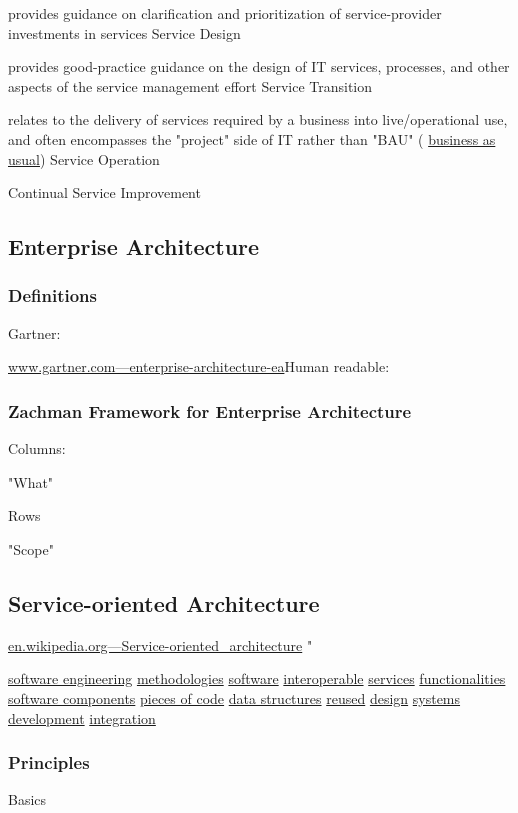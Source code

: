 \documentclass{article}
\begin{document}
provides guidance on clarification and prioritization of service-provider investments in services
Service Design

provides good-practice guidance on the design of IT services, processes, and other aspects of the service management effort
Service Transition

relates to the delivery of services required by a business into live/operational use, and often encompasses the "project" side of IT rather than "BAU" (
\href{http://en.wiktionary.org/wiki/business\_as\_usual}{business as usual})
Service Operation

Continual Service Improvement

\subsection{Enterprise Architecture}
\subsubsection{Definitions}
Gartner:  


\href{http://www.gartner.com/it-glossary/enterprise-architecture-ea/}{www.gartner.com—enterprise-architecture-ea}Human readable: 

\subsubsection{Zachman Framework for Enterprise Architecture}
Columns:

"What"

Rows

"Scope"

\subsection{Service-oriented Architecture}

\href{http://en.wikipedia.org/wiki/Service-oriented\_architecture}{en.wikipedia.org—Service-oriented\_architecture}
 "


\href{http://en.wikipedia.org/wiki/Software\_engineering}{software engineering}
\href{http://en.wikipedia.org/wiki/Methodologies}{methodologies}
\href{http://en.wikipedia.org/wiki/Software}{software}
\href{http://en.wikipedia.org/wiki/Interoperability}{interoperable}
\href{http://en.wikipedia.org/wiki/Service\_\%28systems\_architecture\%29}{services}
\href{http://en.wikipedia.org/wiki/Function\_\%28computer\_science\%29}{functionalities}
\href{http://en.wikipedia.org/wiki/Software\_component}{software components}
\href{http://en.wikipedia.org/wiki/Modular\_programming}{pieces of code}
\href{http://en.wikipedia.org/wiki/Data\_structure}{data structures}
\href{http://en.wikipedia.org/wiki/Code\_reuse}{reused}
\href{http://en.wikipedia.org/wiki/Systems\_design}{design}
\href{http://en.wikipedia.org/wiki/Systems\_development}{systems development}
\href{http://en.wikipedia.org/wiki/Systems\_integration}{integration}\subsubsection{Principles}
Basics
\end{document}
